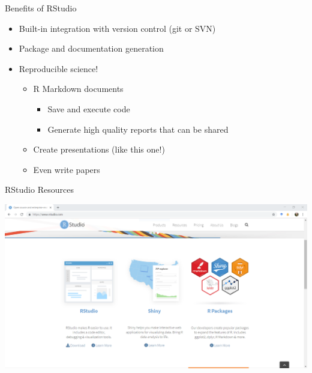 \documentclass[ignorenonframetext,]{beamer}
\providecommand{\tightlist}{%
  \setlength{\itemsep}{0pt}\setlength{\parskip}{0pt}}
\begin{document}
\begin{frame}{Benefits of RStudio}
\protect\hypertarget{benefits-of-rstudio}{}

\begin{itemize}
\tightlist
\item
  Built-in integration with version control (git or SVN)
\item
  Package and documentation generation
\item
  Reproducible science!

  \begin{itemize}
  \tightlist
  \item
    R Markdown documents

    \begin{itemize}
    \tightlist
    \item
      Save and execute code
    \item
      Generate high quality reports that can be shared
    \end{itemize}
  \item
    Create presentations (like this one!)
  \item
    Even write papers
  \end{itemize}
\end{itemize}

\end{frame}

\begin{frame}{RStudio Resources}
\protect\hypertarget{rstudio-resources}{}

\includegraphics{../external/images/rstudio_dot_com_1_main.PNG}

\end{frame}
\end{document}
